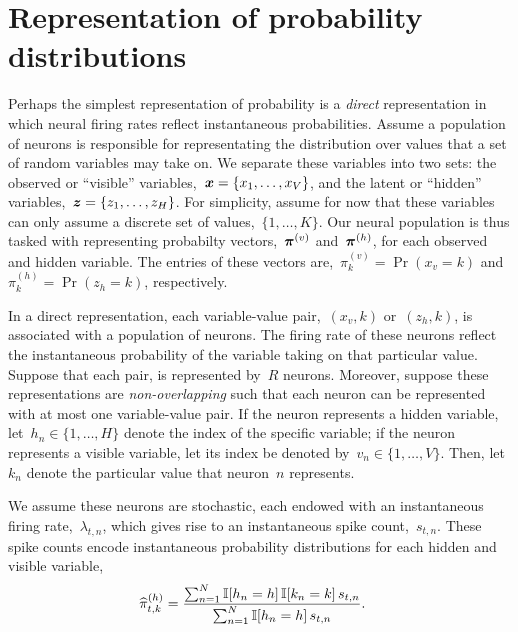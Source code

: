 \section{Representation of probability distributions}

\sloppy
Perhaps the simplest representation of probability is a \emph{direct}
representation in which neural firing rates reflect instantaneous
probabilities. Assume a population of neurons is responsible for
representating the distribution over values that a set of random
variables may take on. We separate these variables into two sets: the
observed or ``visible'' variables,~${\boldsymbol{x} = \{x_1, \ldots, x_V\}}$, and the
latent or ``hidden'' variables,~${\boldsymbol{z} = \{z_1, \ldots, z_H\}}$.  For
simplicity, assume for now that these variables can only assume a
discrete set of values,~${\{1, \ldots, K\}}$.   Our
neural population is thus tasked with representing probabilty
vectors,~$\boldsymbol{\pi}^{(v)}$ and~$\boldsymbol{\pi}^{(h)}$, for each observed and hidden
variable. The entries of these vectors are,~${\pi^{(v)}_k =
  \Pr(x_v=k)}$ and~${\pi^{(h)}_k = \Pr(z_h=k)}$, respectively.

In a direct representation, each variable-value pair,~$(x_v, k)$
or~$(z_h,k)$, is associated with a population of neurons. The firing
rate of these neurons reflect the instantaneous probability of the
variable taking on that particular value.  Suppose that each
pair, is represented by~$R$ neurons. Moreover, suppose
these representations are \emph{non-overlapping} such that each neuron
can be represented with at most one variable-value pair.
If the neuron represents a hidden variable, let~${h_n \in \{1, \ldots, H\}}$
denote the index of the specific variable; if the neuron represents
a visible variable, let its index be denoted by~${v_n \in \{1, \ldots, V\}}$.
Then, let~$k_n$ denote the particular value that neuron~$n$ represents.

We assume these neurons are stochastic, each endowed
with an instantaneous firing rate,~$\lambda_{t,n}$, which gives rise to an
instantaneous spike count,~$s_{t,n}$. These spike counts encode
instantaneous probability distributions for each hidden and visible variable,
\begin{align}
  \widehat{\pi}_{t,k}^{(h)} &=
  \frac{\sum_{n=1}^N \mathbb{I}[h_n=h] \, \mathbb{I}[k_n=k] \, s_{t,n}}
       {\sum_{n=1}^N \mathbb{I}[h_n=h] \, s_{t,n}}.
\end{align}

